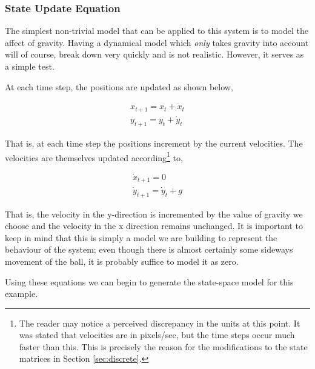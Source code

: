 \subsubsection{State Update Equation}
The simplest non-trivial model that can be applied to this system is to model
the affect of gravity. Having a dynamical model which \emph{only} takes gravity
into account will of course, break down very quickly and is not realistic. However,
it serves as a simple test.

At each time step, the positions are updated as shown below,

\begin{align}
x_{t+1} = x_{t} + \dot{x}_{t} \\
y_{t+1} = y_{t} + \dot{y}_{t}
\end{align}

That is, at each time step the positions increment by the current velocities.
The velocities are themselves updated according\footnote{The reader may notice a
perceived discrepancy in the units
at this point. It was stated that velocities are in pixels/sec, but the time
steps occur much faster than this. This is precisely the reason for the
modifications to the state matrices in Section \ref{sec:discrete}.
}
to,

\begin{align}
\dot{x}_{t+1} = 0 \\
\dot{y}_{t+1} = \dot{y}_{t} + g
\end{align}

That is, the velocity in the y-direction is incremented by the value of gravity
we choose and the velocity in the x direction remains unchanged.
It is important to keep in mind that this is simply a model we are building to
represent the behaviour of the
system; even though there is almost certainly some sideways movement of the ball,
it is probably suffice to model it as zero.

Using these equations we can begin to generate the state-space model for this
example.

